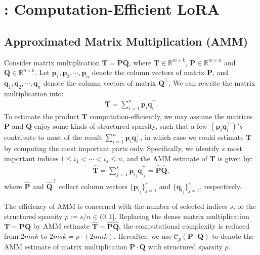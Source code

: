 \section{\celora: Computation-Efficient LoRA}


\subsection{Approximated Matrix Multiplication (AMM)}
Consider matrix multiplication $\mathbf{T}=\mathbf{P}\mathbf{Q}$, where $\mathbf{T}\in\mathbb{R}^{m\times k}$, $\mathbf{P}\in\mathbb{R}^{m\times n}$ and $\mathbf{Q}\in\mathbb{R}^{n\times k}$.
% 
Let $\mathbf{p}_1,\mathbf{p}_2,\cdots,\mathbf{p}_n$ denote the column vectors of matrix $\mathbf{P}$, and $\mathbf{q}_1,\mathbf{q}_2,\cdots,\mathbf{q}_n$ denote the column vectors of matrix $\mathbf{Q}^\top$. 
% 
We can rewrite the matrix multiplication into:
% 
\begin{align*}
    \mathbf{T}=\sum_{i=1}^n\mathbf{p}_i\mathbf{q}_i^\top.
\end{align*}
% 
To estimate the product $\mathbf{T}$ computation-efficiently, we may assume the matrices $\mathbf{P}$ and $\mathbf{Q}$ enjoy some kinds of structured sparsity, such that a few $(\mathbf{p}_i\mathbf{q}_i^\top)'s$ contribute to most of the result $\sum_{i=1}^n\mathbf{p}_i\mathbf{q}_i^\top$, in which case we could estimate $\mathbf{T}$ by computing the most important parts only. Specifically, we identify $s$ most important indices $1\le i_1<\cdots<i_s\le n$, and the AMM estimate of $\mathbf{T}$ is given by:
% 
\begin{align*}
    \hat{\mathbf{T}}=\sum_{j=1}^s{\mathbf{p}_{i_j}\mathbf{q}_{i_j}^\top}=\hat{\mathbf{P}}\hat{\mathbf{Q}},
\end{align*}
% 
where $\hat{\mathbf{P}}$ and $\hat{\mathbf{Q}}^\top$ collect column vectors $\{\mathbf{p}_{i_j}\}_{j=1}^s$ and $\{\mathbf{q}_{i_j}\}_{j=1}^s$, respectively.


The efficiency of AMM is concerned with the number of selected indices $s$, or the structured sparsity  $p:=s/n\in(0,1]$. Replacing the dense matrix multiplication $\mathbf{T}=\mathbf{P}\mathbf{Q}$ by AMM estimate  $\hat{\mathbf{T}}=\hat{\mathbf{P}}\hat{\mathbf{Q}}$, the computational complexity is reduced from $2mnk$ to $2msk=p\cdot (2mnk)$.
% 
Hereafter, we use $\mathcal{C}_p(\mathbf{P}\cdot\mathbf{Q})$ to denote the AMM estimate of matrix multiplication $\mathbf{P}\cdot\mathbf{Q}$ with structured sparsity $p$.

